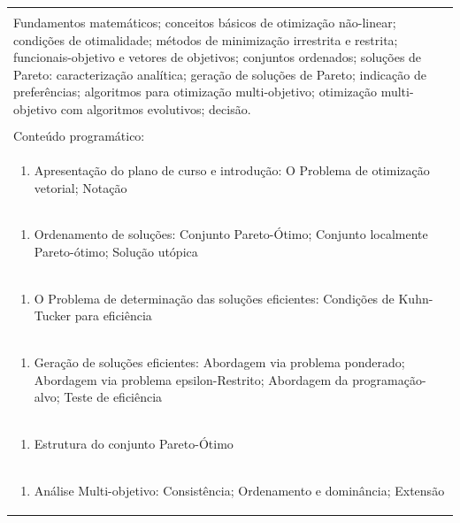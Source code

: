 \documentclass[11pt]{article}
\begin{document}
\begin{center}
\begin{longtable}{|p{4cm}|p{4cm}|p{4cm}|p{4cm}|}
\multicolumn{4}{|p{16cm}|}{}\\
\multicolumn{4}{|p{\dimexpr 16cm + 6\tabcolsep\relax}|}{Fundamentos matemáticos; conceitos básicos de otimização não-linear; condições de otimalidade; métodos de minimização irrestrita e restrita; funcionais-objetivo e vetores de objetivos; conjuntos ordenados; soluções de Pareto: caracterização analítica; geração de soluções de Pareto; indicação de preferências; algoritmos para otimização multi-objetivo; otimização multi-objetivo com algoritmos evolutivos; decisão.}\\
\multicolumn{4}{|p{16cm}|}{}\\
\hline
\multicolumn{4}{|p{16cm}|}{Conteúdo programático:}\\*
\multicolumn{4}{|p{\dimexpr 16cm + 6\tabcolsep\relax}|}{\begin{enumerate}[start=1]\item Apresentação do plano de curso e introdução: O Problema de otimização vetorial; Notação\end{enumerate}}\\
\multicolumn{4}{|p{\dimexpr 16cm + 6\tabcolsep\relax}|}{\begin{enumerate}[start=2]\item Ordenamento de soluções: Conjunto Pareto-Ótimo; Conjunto localmente Pareto-ótimo; Solução utópica\end{enumerate}}\\
\multicolumn{4}{|p{\dimexpr 16cm + 6\tabcolsep\relax}|}{\begin{enumerate}[start=3]\item O Problema de determinação das soluções eficientes: Condições de Kuhn-Tucker para eficiência\end{enumerate}}\\
\multicolumn{4}{|p{\dimexpr 16cm + 6\tabcolsep\relax}|}{\begin{enumerate}[start=4]\item Geração de soluções eficientes: Abordagem via problema ponderado; Abordagem via problema epsilon-Restrito; Abordagem da programação-alvo; Teste de eficiência\end{enumerate}}\\
\multicolumn{4}{|p{\dimexpr 16cm + 6\tabcolsep\relax}|}{\begin{enumerate}[start=5]\item Estrutura do conjunto Pareto-Ótimo\end{enumerate}}\\
\multicolumn{4}{|p{\dimexpr 16cm + 6\tabcolsep\relax}|}{\begin{enumerate}[start=6]\item Análise Multi-objetivo: Consistência; Ordenamento e dominância; Extensão\end{enumerate}}\\

\end{longtable}
\end{center}
\end{document}
